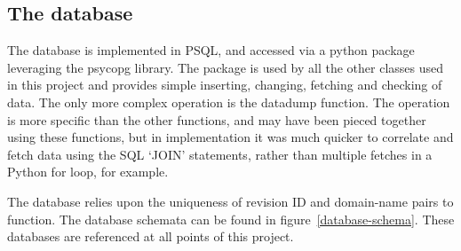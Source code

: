 \subsection*{The database}
The database is implemented in PSQL, and accessed via a python package
leveraging the psycopg library. The package is used by all the other
classes used in this project and provides simple inserting, changing,
fetching and checking of data. The only more complex operation is the
datadump function. The operation is more specific than the other
functions, and may have been pieced together using these functions,
but in implementation it was much quicker to correlate and fetch data
using the SQL `JOIN' statements, rather than multiple fetches in a
Python for loop, for example.

The database relies upon the uniqueness of revision ID and domain-name
pairs to function. The database schemata can be found in
figure~\ref{database-schema}. These databases are referenced at all
points of this project.

